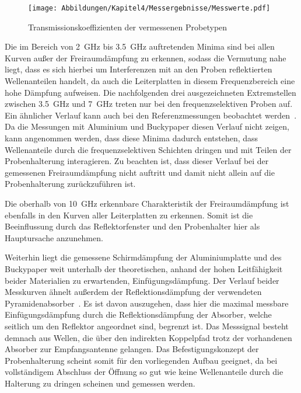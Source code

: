 \begin{figure}[ht]
    \centering
    \texttt{[image: Abbildungen/Kapitel4/Messergebnisse/Messwerte.pdf]}
    \caption{Transmissionskoeffizienten der vermessenen Probetypen}
    \label{fig:4_Messwerte}
\end{figure}

Die im Bereich von \SI{2}{\giga\hertz} bis \SI{3,5}{\giga\hertz} auftretenden Minima sind bei allen Kurven außer der Freiraumdämpfung zu erkennen, sodass die Vermutung nahe liegt, dass es sich hierbei um Interferenzen mit an den Proben reflektierten Wellenanteilen handelt, da auch die Leiterplatten in diesem Frequenzbereich eine hohe Dämpfung aufweisen. Die nachfolgenden drei ausgezeichneten Extremstellen zwischen \SI{3,5}{\giga\hertz} und \SI{7}{\giga\hertz} treten nur bei den frequenzselektiven Proben auf. Ein ähnlicher Verlauf kann auch bei den Referenzmessungen beobachtet werden~\cite{FSS_Toedter_Diplomarbeit}. Da die Messungen mit Aluminium und Buckypaper diesen Verlauf nicht zeigen, kann angenommen werden, dass diese Minima dadurch entstehen, dass Wellenanteile durch die frequenzselektiven Schichten dringen und mit Teilen der Probenhalterung interagieren. Zu beachten ist, dass dieser Verlauf bei der gemessenen Freiraumdämpfung nicht auftritt und damit nicht allein auf die Probenhalterung zurückzuführen ist. 
\par
\vspace{\linespace}
Die oberhalb von \SI{10}{\giga\hertz} erkennbare Charakteristik der Freiraumdämpfung ist ebenfalls in den \mbox{Kurven} aller Leiterplatten zu erkennen. Somit ist die Beeinflussung durch das Reflektorfenster und den Probenhalter hier als Hauptursache anzunehmen.
\par
\vspace{\linespace}
Weiterhin liegt die gemessene Schirmdämpfung der Aluminiumplatte und des Buckypaper weit unterhalb der theoretischen, anhand der hohen Leitfähigkeit beider Materialien zu erwartenden, Einfügungsdämpfung. Der Verlauf beider Messkurven ähnelt außerdem der Reflektionsdämpfung der verwendeten Pyramidenabsorber~\cite{Eco_Messtechnik_Absorber}. Es ist davon auszugehen, dass hier die maximal messbare Einfügungsdämpfung durch die Reflektionsdämpfung der Absorber, welche seitlich um den Reflektor angeordnet sind, begrenzt ist. Das Messsignal besteht demnach aus Wellen, die über den indirekten Koppelpfad trotz der vorhandenen Absorber zur Empfangsantenne gelangen. Das Befestigungskonzept der Probenhalterung scheint somit für den vorliegenden Aufbau geeignet, da bei vollständigem Abschluss der Öffnung so gut wie keine Wellenanteile durch die Halterung zu dringen scheinen und gemessen werden.
\par
\vspace{\linespace}





